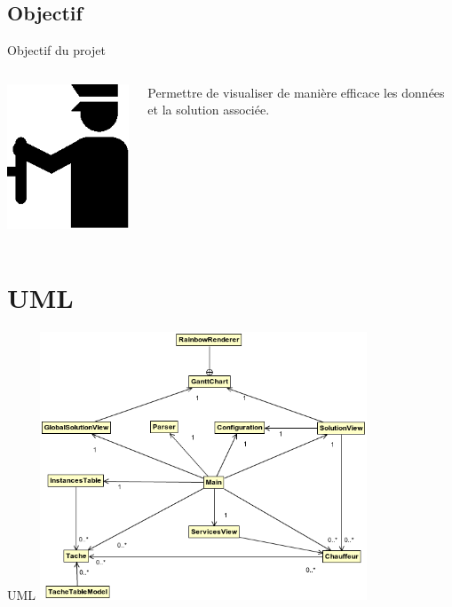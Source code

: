 \documentclass[xcolor=x11names,12pt,compress]{beamer}
\begin{document}
\subsection{Objectif}
\begin{frame}{Objectif du projet}
    \begin{columns}
        \begin{column}{0.2\textwidth}
            \includegraphics{driver.eps}
    \end{column}
        \begin{column}{0.6\textwidth}
        \large Permettre de visualiser de manière efficace les données et la solution associée.
    \end{column}
    \end{columns}
\end{frame}

\section{UML}
\begin{frame}[plain]{UML}
    \includegraphics[width=\textwidth, height=8cm]{../UML/simple.png}
\end{frame}
\end{document}

